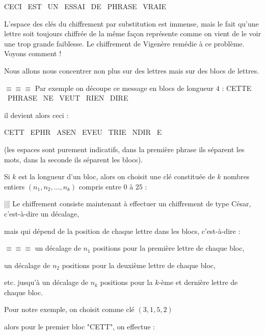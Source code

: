 \change

\centerline{CECI \ EST \ UN \ ESSAI \ DE \ PHRASE \ VRAIE}

\diapo


L'espace des clés du chiffrement par substitution est immense, mais le
fait qu'une lettre soit toujours chiffrée de la même façon représente comme on vient de le voir une trop grande faiblesse.
Le chiffrement de Vigenère remédie à ce problème. Voyons comment !


Nous allons nous concentrer non plus sur des lettres mais sur des blocs de lettres.

\change

$\equiv \equiv \equiv $ 
Par exemple on découpe ce message en blocs de longueur $4$ : 
{CETTE \ PHRASE \  NE \ VEUT \ RIEN \ DIRE}

\change

il devient alors ceci :

{CETT \ EPHR \ ASEN \ EVEU \ TRIE \ NDIR \ E}

(les espaces sont purement indicatifs, dans la première phrase ils séparent les mots,
dans la seconde ils séparent les blocs).

\change

Si $k$ est la longueur d'un bloc, alors on choisit une clé constituée 
de $k$ nombres entiers $(n_1,n_2,\ldots,n_k)$ compris entre $0$ à $25$ :


\change

||| Le chiffrement consiste maintenant à effectuer un chiffrement de type César, c'est-à-dire un décalage, 

mais qui dépend de la position de chaque lettre dans les blocs, c'est-à-dire : 

\change

$\equiv \equiv \equiv $ 
un décalage de $n_1$ positions pour la première lettre de chaque bloc,

\change 

un décalage de $n_2$ positions pour la deuxième lettre de chaque bloc,

\change

etc. jusqu'à un décalage de $n_k$ positions pour la $k$-ème et dernière lettre de chaque bloc. 


\change

Pour notre exemple, on choisit comme clé $(3,1,5,2)$ 

alors pour le premier bloc "CETT", on effectue  :

